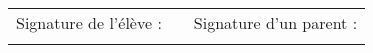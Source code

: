 \documentclass[a4paper, 14pt]{extarticle}
\begin{document}
%			
%	
%	
%	
%	
%	
%	
%	
%
%
%	
%	
%	
%	
%	
%	
%	
%	

\vspace*{0.5cm}
\begin{tabular}{ccr}
	
	Signature de l'élève : & \hspace*{5cm} & Signature d'un parent : \\
	&  &                      
\end{tabular}
	
	
	
%
\end{document}
